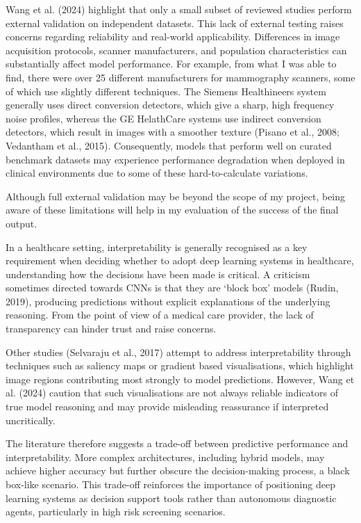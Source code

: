 Wang et al. (2024) highlight that only a small subset of reviewed studies perform external validation on independent datasets. This lack of external testing raises concerns regarding reliability and real-world applicability. Differences in image acquisition protocols, scanner manufacturers, and population characteristics can substantially affect model performance. For example, from what I was able to find, there were over 25 different manufacturers for mammography scanners, some of which use slightly different techniques. The Siemens Healthineers system generally uses direct conversion detectors, which give a sharp, high frequency noise profiles, whereas the GE HelathCare systems use indirect conversion detectors, which result in images with a smoother texture (Pisano et al., 2008; Vedantham et al., 2015). Consequently, models that perform well on curated benchmark datasets may experience performance degradation when deployed in clinical environments due to some of these hard-to-calculate variations.

Although full external validation may be beyond the scope of my project, being aware of these limitations will help in my evaluation of the success of the final output. 

In a healthcare setting, interpretability is generally recognised as a key requirement when deciding whether to adopt deep learning systems in healthcare, understanding how the decisions have been made is critical. A criticism sometimes directed towards CNNs is that they are ‘block box’ models (Rudin, 2019), producing predictions without explicit explanations of the underlying reasoning. From the point of view of a medical care provider, the lack of transparency can hinder trust and raise concerns.

Other studies (Selvaraju et al., 2017) attempt to address interpretability through techniques such as saliency maps or gradient based visualisations, which highlight image regions contributing most strongly to model predictions. However, Wang et al. (2024) caution that such visualisations are not always reliable indicators of true model reasoning and may provide misleading reassurance if interpreted uncritically.

The literature therefore suggests a trade-off between predictive performance and interpretability. More complex architectures, including hybrid models, may achieve higher accuracy but further obscure the decision-making process, a black box-like scenario. This trade-off reinforces the importance of positioning deep learning systems as decision support tools rather than autonomous diagnostic agents, particularly in high risk screening scenarios.

